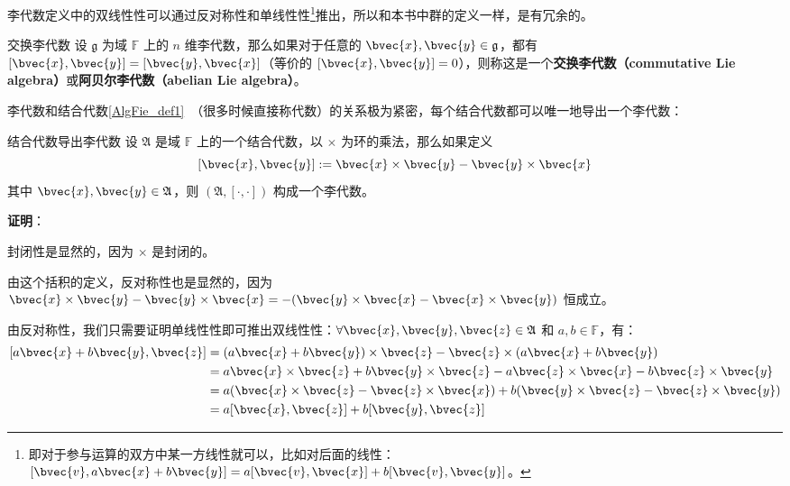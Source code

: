 
李代数定义中的双线性性可以通过反对称性和单线性性\footnote{即对于参与运算的双方中某一方线性就可以，比如对后面的线性：$[\bvec{v},a\bvec{x}+b\bvec{y}]=a[\bvec{v}, \bvec{x}]+b[\bvec{v}, \bvec{y}]$。}推出，所以和本书中群的定义一样，是有冗余的。

\begin{definition}{交换李代数}
设 $\mathfrak{g}$ 为域 $\mathbb{F}$ 上的 $n$ 维李代数，那么如果对于任意的 $\bvec{x},\bvec{y}\in\mathfrak{g}$，都有 $[\bvec{x}, \bvec{y}] = [\bvec{y}, \bvec{x}]$（等价的 $[\bvec{x}, \bvec{y}] = 0$），则称这是一个\textbf{交换李代数（commutative Lie algebra）}或\textbf{阿贝尔李代数（abelian Lie algebra）}。
\end{definition}

李代数和结合代数\autoref{AlgFie_def1}~（很多时候直接称代数）的关系极为紧密，每个结合代数都可以唯一地导出一个李代数：

\begin{theorem}{结合代数导出李代数}\label{LieAlg_the2}
设 $\mathfrak{A}$ 是域 $\mathbb{F}$ 上的一个结合代数，以 $\times$ 为环的乘法，那么如果定义
$$
[\bvec{x}, \bvec{y}] := \bvec{x}\times \bvec{y}-\bvec{y}\times \bvec{x}
$$
其中 $\bvec{x}, \bvec{y}\in\mathfrak{A}$，则 $(\mathfrak{A}, [\cdot, \cdot])$ 构成一个李代数。
\end{theorem}

\textbf{证明}：

封闭性是显然的，因为 $\times$ 是封闭的。

由这个括积的定义，反对称性也是显然的，因为 $\bvec{x}\times \bvec{y}-\bvec{y}\times \bvec{x}=-(\bvec{y}\times \bvec{x}-\bvec{x}\times \bvec{y})$ 恒成立。

由反对称性，我们只需要证明单线性性即可推出双线性性：$\forall \bvec{x}, \bvec{y}, \bvec{z}\in\frak{A}$ 和 $a, b\in\mathbb{F}$，有：
\begin{equation}
\begin{aligned}
{[a\bvec{x}+b\bvec{y}, \bvec{z}]}&=(a\bvec{x}+b\bvec{y})\times\bvec{z}-\bvec{z}\times(a\bvec{x}+b\bvec{y})\\
&=a\bvec{x}\times\bvec{z}+b\bvec{y}\times\bvec{z}-a\bvec{z}\times\bvec{x}-b\bvec{z}\times\bvec{y}\\
&=a(\bvec{x}\times\bvec{z}-\bvec{z}\times\bvec{x})+b(\bvec{y}\times\bvec{z}-\bvec{z}\times\bvec{y})\\
&=a[\bvec{x}, \bvec{z}]+b[\bvec{y}, \bvec{z}]
\end{aligned}
\end{equation}

